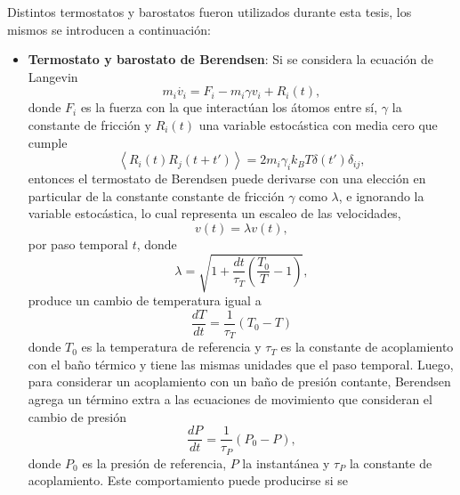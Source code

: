 Distintos termostatos y barostatos fueron utilizados durante esta tesis, los 
mismos se introducen a continuación:
\begin{itemize}
    \item \textbf{Termostato y barostato de Berendsen}:
        Si se considera la ecuación de Langevin \cite{schneider1978}
        \begin{equation}\label{eq:langevin}
            m_i \dot{v_i} = F_i - m_i \gamma v_i + R_i(t),
        \end{equation}
        donde $F_i$ es la fuerza con la que interactúan los átomos entre sí, 
        $\gamma$ la constante de fricción y $R_i(t)$ una variable estocástica con 
        media cero que cumple 
        \begin{equation}
            \left\langle R_i(t) R_j(t+t') \right\rangle = 2m_i \gamma_i k_B T \delta(t') \delta_{ij},
        \end{equation}
        entonces el termostato de Berendsen \cite{berendsen1984} puede derivarse 
        con una elección en particular de la constante constante de fricción 
        $\gamma$ como $\lambda$, e ignorando la variable estocástica, lo cual 
        representa un escaleo de las velocidades,
        \begin{equation}
            v(t) = \lambda v(t),
        \end{equation}
        por paso temporal $t$, donde
        \begin{equation}
            \lambda = \sqrt{1 + \frac{dt}{\tau_T} \left( \frac{T_0}{T} - 1 \right)},
        \end{equation}
        produce un cambio de temperatura igual a
        \begin{equation}
            \frac{dT}{dt} = \frac{1}{\tau_T} (T_0 - T)
        \end{equation}
        donde $T_0$ es la temperatura de referencia y $\tau_T$ es la constante de
        acoplamiento con el baño térmico y tiene las mismas unidades que el paso 
        temporal. Luego, para considerar un acoplamiento con un baño de presión 
        contante, Berendsen \cite{berendsen1984} agrega un término extra a las 
        ecuaciones de movimiento que consideran el cambio de presión
        \begin{equation}
            \frac{dP}{dt} = \frac{1}{\tau_P} (P_0 - P),
        \end{equation}
        donde $P_0$ es la presión de referencia, $P$ la instantánea y $\tau_P$ la 
        constante de acoplamiento. Este comportamiento puede producirse si se 

\end{itemize}
